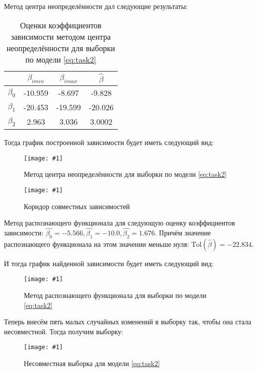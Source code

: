 \documentclass[a4paper,12pt]{article}
\newcommand{\plot}[3]{
    \begin{figure}[H]
        \texttt{[image: \#1]}
        \caption{#2}
        \label{#3}
    \end{figure}
}
\begin{document}
    \noindent Метод центра неопределённости дал следующие результаты:
    \begin{table}[H]
        \begin{center}
            \begin{tabular}{| c | c | c | c |}
                \hline
                & $ \beta_{imin} $ & $ \beta_{imax} $ & $ \hat{\beta} $ \\
                \hline
                $ \beta_{0} $ & -10.959 & -8.697 & -9.828 \\
                \hline
                $ \beta_{1} $ & -20.453 & -19.599 & -20.026 \\
                \hline
                $ \beta_{2} $ & 2.963 & 3.036 & 3.0002 \\
                \hline
            \end{tabular}
        \end{center}
        \caption{Оценки коэффициентов зависимости методом центра неопределённости для выборки по модели \ref{eq:task2}}
        \label{t:validdata50}
    \end{table}

    \noindent Тогда график построенной зависимости будет иметь следующий вид:
    \plot{UndefinedCenterValidData50}{Метод центра неопределённости для выборки по модели \ref{eq:task2}}{p:ucvaliddata50}
    \plot{CorridorUndefinedCenterValidData50}{Коридор совместных зависимостей}{p:corridorvaliddata50}

    \noindent Метод распознающего функционала для следующую оценку коэффициентов зависимости:
    $ \hat{\beta_0} = -5.566, \hat{\beta_{1}} = -10.0, \hat{\beta_{2}} = 1.676 $.
    Причём значение распознающего функционала на этом значении меньше нуля: $ \text{Tol}(\hat{\beta}) = -22.834 $.
    
    \noindent И тогда график найденной зависимости будет иметь следующий вид:
    \plot{TolValidData50}{Метод распознающего функционала для выборки по модели \ref{eq:task2}}{p:tolvaliddata50}

    \noindent Теперь внесём пять малых случайных изменений в выборку так, чтобы она стала несовместной. Тогда получим выборку:
    \plot{DataWithEstims50}{Несовместная выборка для модели \ref{eq:task2}}{p:estimdata50}
\end{document}
